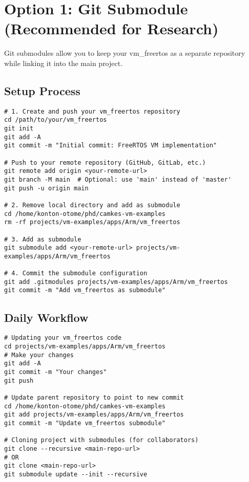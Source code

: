 \documentclass[11pt,a4paper]{article}
\begin{document}
\section{Option 1: Git Submodule (Recommended for Research)}

Git submodules allow you to keep your vm\_freertos as a separate repository while linking it into the main project.

\subsection{Setup Process}

\begin{lstlisting}[caption=Setting Up Git Submodule]
# 1. Create and push your vm_freertos repository
cd /path/to/your/vm_freertos
git init
git add -A
git commit -m "Initial commit: FreeRTOS VM implementation"

# Push to your remote repository (GitHub, GitLab, etc.)
git remote add origin <your-remote-url>
git branch -M main  # Optional: use 'main' instead of 'master'
git push -u origin main

# 2. Remove local directory and add as submodule
cd /home/konton-otome/phd/camkes-vm-examples
rm -rf projects/vm-examples/apps/Arm/vm_freertos

# 3. Add as submodule
git submodule add <your-remote-url> projects/vm-examples/apps/Arm/vm_freertos

# 4. Commit the submodule configuration
git add .gitmodules projects/vm-examples/apps/Arm/vm_freertos
git commit -m "Add vm_freertos as submodule"
\end{lstlisting}

\subsection{Daily Workflow}

\begin{lstlisting}[caption=Working with Submodules]
# Updating your vm_freertos code
cd projects/vm-examples/apps/Arm/vm_freertos
# Make your changes
git add -A
git commit -m "Your changes"
git push

# Update parent repository to point to new commit
cd /home/konton-otome/phd/camkes-vm-examples
git add projects/vm-examples/apps/Arm/vm_freertos
git commit -m "Update vm_freertos submodule"

# Cloning project with submodules (for collaborators)
git clone --recursive <main-repo-url>
# OR
git clone <main-repo-url>
git submodule update --init --recursive
\end{lstlisting}
\end{document}
